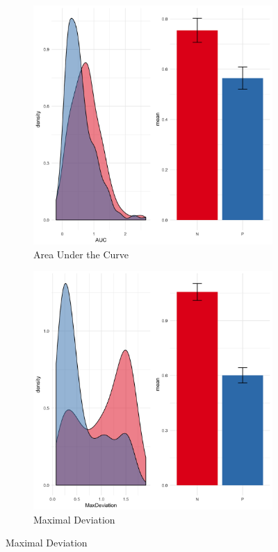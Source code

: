 \documentclass{article}
\begin{document}
\begin{itemize}
\begin{figure}
\centering
\begin{subfigure}[b]{0.4\textwidth}
\includegraphics[width=\textwidth]{AUC-negation.png}
\caption{Area Under the Curve}
\end{subfigure}
%
\begin{subfigure}[b]{0.4\textwidth}
\includegraphics[width=\textwidth]{MaxDeviation-negation.png}
\caption{Maximal Deviation}
\end{subfigure}


\end{figure}
\end{itemize}
\end{document}
